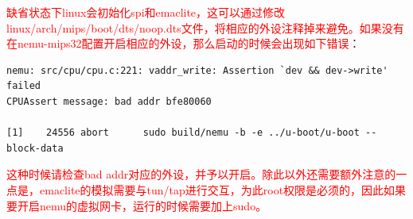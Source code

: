 \documentclass[lang=cn,11pt,a4paper]{elegantpaper}
\begin{document}
\textcolor{red}{缺省状态下linux会初始化spi和emaclite，这可以通过修改linux/arch/mips/boot/dts/noop.dts文件，将相应的外设注释掉来避免。如果没有在nemu-mips32配置开启相应的外设，那么启动的时候会出现如下错误}：
\begin{lstlisting}
nemu: src/cpu/cpu.c:221: vaddr_write: Assertion `dev && dev->write' failed
CPUAssert message: bad addr bfe80060

[1]    24556 abort      sudo build/nemu -b -e ../u-boot/u-boot --block-data
\end{lstlisting}
\textcolor{red}{这种时候请检查bad addr对应的外设，并予以开启。除此以外还需要额外注意的一点是，emaclite的模拟需要与tun/tap进行交互，为此root权限是必须的，因此如果要开启nemu的虚拟网卡，运行的时候需要加上sudo。}

\newpage

%
%
\end{document}
